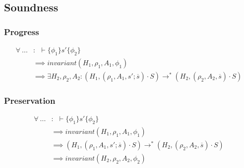 \documentclass[11pt,a4paper]{article}
\newcommand{\hoare}[3]{\vdash\{#1\}#2\{#3\}}
\begin{document}
\subsection{Soundness}
\subsubsection{Progress}
\begin{align*}
\forall~ ... &:~~ \hoare {\phi_1} {s'} {\phi_2} 
\\ &\implies invariant(H_1, \rho_1, A_1, \phi_1)
\\ &\implies \exists H_2, \rho_2, A_2 : (H_1, (\rho_1, A_1, s' ; \overline{s}) \cdot S)
							\rightarrow^* (H_2, (\rho_2, A_2, \overline{s}) \cdot S)
\end{align*}

\subsubsection{Preservation}
\begin{align*}
\forall~ ... &:~~ \hoare {\phi_1} {s'} {\phi_2} 
\\ &\implies invariant(H_1, \rho_1, A_1, \phi_1)
\\ &\implies (H_1, (\rho_1, A_1, s' ; \overline{s}) \cdot S)
  \rightarrow^* (H_2, (\rho_2, A_2, \overline{s}) \cdot S)
\\ &\implies invariant(H_2, \rho_2, A_2, \phi_2)
\end{align*}
\end{document}
